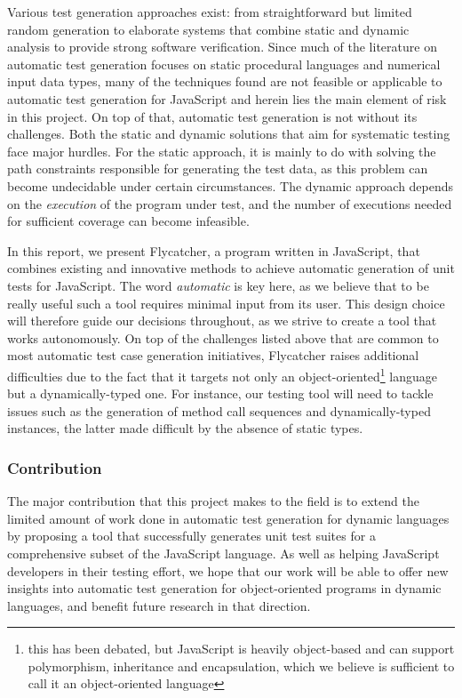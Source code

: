 Various test generation approaches exist: from straightforward but limited random generation to elaborate systems that combine static and dynamic analysis to provide strong software verification. Since much of the literature on automatic test generation focuses on static procedural languages and numerical input data types, many of the techniques found are not feasible or applicable to automatic test generation for JavaScript and herein lies the main element of risk in this project. On top of that, automatic test generation is not without its challenges. Both the static and dynamic solutions that aim for systematic testing face major hurdles. For the static approach, it is mainly to do with solving the path constraints responsible for generating the test data, as this problem can become undecidable under certain circumstances. The dynamic approach depends on the \emph{execution} of the program under test, and the number of executions needed for sufficient coverage can become infeasible.

In this report, we present \textsf{Flycatcher}, a program written in JavaScript, that combines existing and innovative methods to achieve automatic generation of unit tests for JavaScript. The word \emph{automatic} is key here, as we believe that to be really useful such a tool requires minimal input from its user. This design choice will therefore guide our decisions throughout, as we strive to create a tool that works autonomously. On top of the challenges listed above that are common to most automatic test case generation initiatives, \textsf{Flycatcher} raises additional difficulties due to the fact that it targets not only an object-oriented\footnote{this has been debated, but JavaScript is heavily object-based and can support polymorphism, inheritance and encapsulation, which we believe is sufficient to call it an object-oriented language} language but a dynamically-typed one. For instance, our testing tool will need to tackle issues such as the generation of method call sequences and dynamically-typed instances, the latter made difficult by the absence of static types.

\subsubsection{Contribution}

The major contribution that this project makes to the field is to extend the limited amount of work done in automatic test generation for dynamic languages by proposing a tool that successfully generates unit test suites for a comprehensive subset of the JavaScript language. As well as helping JavaScript developers in their testing effort, we hope that our work will be able to offer new insights into automatic test generation for object-oriented programs in dynamic languages, and benefit future research in that direction.